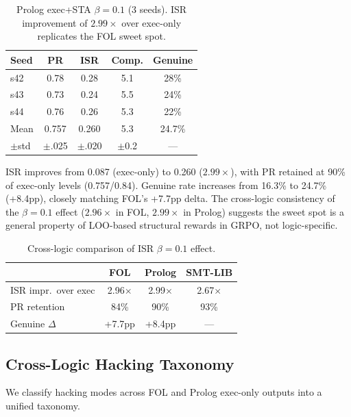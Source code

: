 \documentclass[11pt,twocolumn]{article}
\newcommand{\isr}{\textsc{ISR}}
\newcommand{\pr}{\textsc{PR}}
\newcommand{\grpo}{\textsc{GRPO}}
\begin{document}
\begin{table}[h]
\centering
\caption{Prolog exec+STA $\beta{=}0.1$ (3 seeds). ISR improvement of $2.99\times$ over exec-only replicates the FOL sweet spot.}
\label{tab:prolog_sta}
\small
\begin{tabular}{@{}lcccc@{}}
\toprule
Seed & \pr{} & \isr{} & Comp. & Genuine \\
\midrule
s42 & 0.78 & 0.28 & 5.1 & 28\% \\
s43 & 0.73 & 0.24 & 5.5 & 24\% \\
s44 & 0.76 & 0.26 & 5.3 & 22\% \\
\midrule
Mean & 0.757 & 0.260 & 5.3 & 24.7\% \\
$\pm$std & $\pm$.025 & $\pm$.020 & $\pm$0.2 & --- \\
\bottomrule
\end{tabular}
\end{table}

\isr{} improves from 0.087 (exec-only) to 0.260 ($2.99\times$), with \pr{} retained at 90\% of exec-only levels (0.757/0.84).
Genuine rate increases from 16.3\% to 24.7\% (+8.4pp), closely matching FOL's +7.7pp delta.
The cross-logic consistency of the $\beta{=}0.1$ effect ($2.96\times$ in FOL, $2.99\times$ in Prolog) suggests the sweet spot is a general property of LOO-based structural rewards in \grpo{}, not logic-specific.

\begin{table}[h]
\centering
\caption{Cross-logic comparison of ISR $\beta{=}0.1$ effect.}
\label{tab:cross_logic_b01}
\small
\begin{tabular}{@{}lccc@{}}
\toprule
& FOL & Prolog & SMT-LIB \\
\midrule
ISR impr.\ over exec & 2.96$\times$ & 2.99$\times$ & 2.67$\times$ \\
PR retention & 84\% & 90\% & 93\% \\
Genuine $\Delta$ & +7.7pp & +8.4pp & --- \\
\bottomrule
\end{tabular}
\end{table}

\subsection{Cross-Logic Hacking Taxonomy}

We classify hacking modes across FOL and Prolog exec-only outputs into a unified taxonomy.
\end{document}
